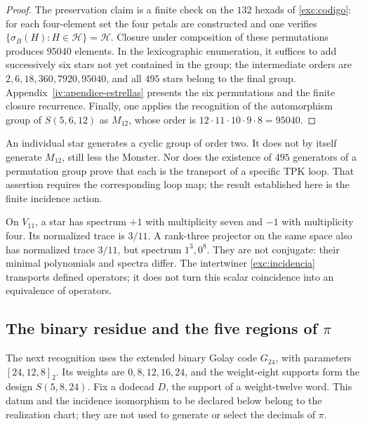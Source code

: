 \begin{proof}
The preservation claim is a finite check on the
$132$ hexads of \eqref{exc:codigo}: for each four-element set the
four petals are constructed and one verifies
$\{\sigma_B(H):H\in\mathcal H\}=\mathcal H$.
Closure under composition of these permutations produces $95040$
elements. In the lexicographic enumeration, it suffices to add successively
six stars not yet contained in the group; the intermediate orders
are $2,6,18,360,7920,95040$, and all $495$ stars belong to the final
group. Appendix~\ref{iv:apendice-estrellas} presents the six
permutations and the finite closure recurrence. Finally, one applies the recognition
of the automorphism group of $S(5,6,12)$ as $M_{12}$, whose order is
$12\cdot11\cdot10\cdot9\cdot8=95040$.
\end{proof}

An individual star generates a cyclic group of order two. It does
not by itself generate $M_{12}$, still less the Monster. Nor does the
existence of $495$ generators of a permutation group prove that
each is the transport of a specific TPK loop. That assertion
requires the corresponding loop map; the result established here
is the finite incidence action.

\begin{remark}
On $V_{11}$, a star has spectrum $+1$ with multiplicity seven
and $-1$ with multiplicity four. Its normalized trace is $3/11$.
A rank-three projector on the same space also has normalized
trace $3/11$, but spectrum $1^3,0^8$. They are not conjugate: their
minimal polynomials and spectra differ. The intertwiner
\eqref{exc:incidencia} transports defined operators; it does not turn
this scalar coincidence into an equivalence of operators.
\end{remark}



\subsection{The binary residue and the five regions of \texorpdfstring{$\pi$}{pi}}
\label{exc:cinco-regiones}

The next recognition uses the extended binary Golay code
$G_{24}$, with parameters $[24,12,8]_2$. Its weights are
$0,8,12,16,24$, and the weight-eight supports form the design
$S(5,8,24)$. Fix a dodecad $D$, the support of a weight-twelve
word. This datum and the incidence isomorphism to be declared
below belong to the realization chart; they are not used to
generate or select the decimals of $\pi$.

